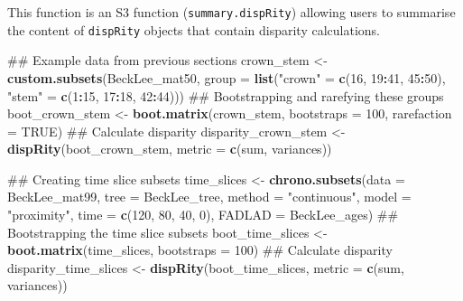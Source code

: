 \documentclass[]{book}
\newenvironment{Shaded}{\begin{snugshade}}{\end{snugshade}}
\newcommand{\KeywordTok}[1]{\textcolor[rgb]{0.13,0.29,0.53}{\textbf{#1}}}
\newcommand{\DataTypeTok}[1]{\textcolor[rgb]{0.13,0.29,0.53}{#1}}
\newcommand{\DecValTok}[1]{\textcolor[rgb]{0.00,0.00,0.81}{#1}}
\newcommand{\StringTok}[1]{\textcolor[rgb]{0.31,0.60,0.02}{#1}}
\newcommand{\OtherTok}[1]{\textcolor[rgb]{0.56,0.35,0.01}{#1}}
\newcommand{\OperatorTok}[1]{\textcolor[rgb]{0.81,0.36,0.00}{\textbf{#1}}}
\newcommand{\NormalTok}[1]{#1}
\theoremstyle{definition}
\theoremstyle{definition}
\theoremstyle{definition}
\theoremstyle{remark}
\begin{document}
This function is an S3 function (\texttt{summary.dispRity}) allowing
users to summarise the content of \texttt{dispRity} objects that contain
disparity calculations.

\begin{Shaded}
\begin{Highlighting}[]
\NormalTok{## Example data from previous sections}
\NormalTok{crown_stem <-}\StringTok{ }\KeywordTok{custom.subsets}\NormalTok{(BeckLee_mat50,}
                                \DataTypeTok{group =} \KeywordTok{list}\NormalTok{(}\StringTok{"crown"}\NormalTok{ =}\StringTok{ }\KeywordTok{c}\NormalTok{(}\DecValTok{16}\NormalTok{, }\DecValTok{19}\OperatorTok{:}\DecValTok{41}\NormalTok{, }\DecValTok{45}\OperatorTok{:}\DecValTok{50}\NormalTok{), }
                                             \StringTok{"stem"}\NormalTok{ =}\StringTok{ }\KeywordTok{c}\NormalTok{(}\DecValTok{1}\OperatorTok{:}\DecValTok{15}\NormalTok{, }\DecValTok{17}\OperatorTok{:}\DecValTok{18}\NormalTok{, }\DecValTok{42}\OperatorTok{:}\DecValTok{44}\NormalTok{)))}
\NormalTok{## Bootstrapping and rarefying these groups}
\NormalTok{boot_crown_stem <-}\StringTok{ }\KeywordTok{boot.matrix}\NormalTok{(crown_stem, }\DataTypeTok{bootstraps =} \DecValTok{100}\NormalTok{, }\DataTypeTok{rarefaction =} \OtherTok{TRUE}\NormalTok{)}
\NormalTok{## Calculate disparity}
\NormalTok{disparity_crown_stem <-}\StringTok{ }\KeywordTok{dispRity}\NormalTok{(boot_crown_stem, }\DataTypeTok{metric =} \KeywordTok{c}\NormalTok{(sum, variances))}

\NormalTok{## Creating time slice subsets}
\NormalTok{time_slices <-}\StringTok{ }\KeywordTok{chrono.subsets}\NormalTok{(}\DataTypeTok{data =}\NormalTok{ BeckLee_mat99, }\DataTypeTok{tree =}\NormalTok{ BeckLee_tree, }
    \DataTypeTok{method =} \StringTok{"continuous"}\NormalTok{, }\DataTypeTok{model =} \StringTok{"proximity"}\NormalTok{, }\DataTypeTok{time =} \KeywordTok{c}\NormalTok{(}\DecValTok{120}\NormalTok{, }\DecValTok{80}\NormalTok{, }\DecValTok{40}\NormalTok{, }\DecValTok{0}\NormalTok{),}
    \DataTypeTok{FADLAD =}\NormalTok{ BeckLee_ages)}
\NormalTok{## Bootstrapping the time slice subsets}
\NormalTok{boot_time_slices <-}\StringTok{ }\KeywordTok{boot.matrix}\NormalTok{(time_slices, }\DataTypeTok{bootstraps =} \DecValTok{100}\NormalTok{)}
\NormalTok{## Calculate disparity}
\NormalTok{disparity_time_slices <-}\StringTok{ }\KeywordTok{dispRity}\NormalTok{(boot_time_slices, }\DataTypeTok{metric =} \KeywordTok{c}\NormalTok{(sum, variances))}


\end{Highlighting}
\end{Shaded}
\end{document}
